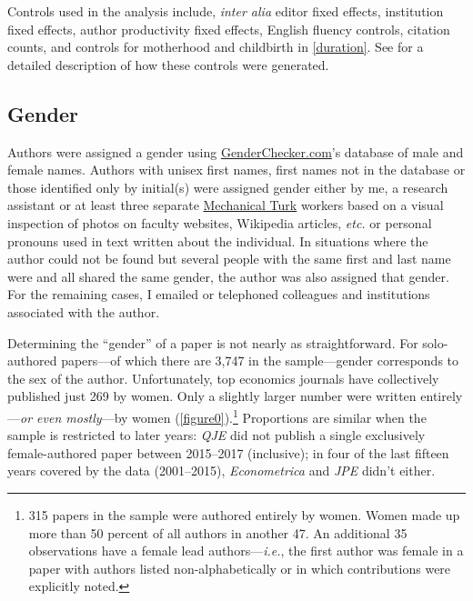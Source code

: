 Controls used in the analysis include, \emph{inter alia} editor fixed effects, institution fixed effects, author productivity fixed effects, English fluency controls, citation counts, and controls for motherhood and childbirth in \autoref{duration}. See  for a detailed description of how these controls were generated.



\subsection{Gender}
\label{data}

Authors were assigned a gender using \href{http://genderchecker.com}{GenderChecker.com}'s database of male and female names. Authors with unisex first names, first names not in the database or those identified only by initial(s) were assigned gender either by me, a research assistant or at least three separate \href{http://www.mturk.com}{Mechanical Turk} workers based on a visual inspection of photos on faculty websites, Wikipedia articles, \emph{etc.} or personal pronouns used in text written about the individual. In situations where the author could not be found but several people with the same first and last name were and all shared the same gender, the author was also assigned that gender. For the remaining cases, I emailed or telephoned colleagues and institutions associated with the author.

Determining the ``gender'' of a paper is not nearly as straightforward. For solo-authored papers---of which there are 3,747 in the sample---gender corresponds to the sex of the author. Unfortunately, top economics journals have collectively published just 269 by women. Only a slightly larger number were written entirely---\emph{or even mostly}---by women (\autoref{figure0}).\footnote{315 papers in the sample were authored entirely by women. Women made up more than 50 percent of all authors in another 47. An additional 35 observations have a female lead authors---\emph{i.e.}, the first author was female in a paper with authors listed non-alphabetically or in which contributions were explicitly noted.} Proportions are similar when the sample is restricted to later years: \emph{QJE} did not publish a single exclusively female-authored paper between 2015--2017 (inclusive); in four of the last fifteen years covered by the data (2001--2015), \emph{Econometrica} and \emph{JPE} didn't either.

